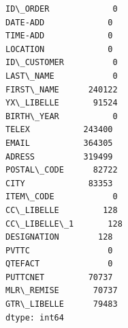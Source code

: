 \documentclass[11pt]{article}
\makeatletter
\newcommand{\boxspacing}{\kern\kvtcb@left@rule\kern\kvtcb@boxsep}
\newcommand{\prompt}[4]{
        \ttfamily\llap{{\color{#2}[#3]:\hspace{3pt}#4}}\vspace{-\baselineskip}
    }
\makeatother
\begin{document}
            \begin{tcolorbox}[breakable, size=fbox, boxrule=.5pt, pad at break*=1mm, opacityfill=0]
\prompt{Out}{outcolor}{15}{\boxspacing}
\begin{Verbatim}[commandchars=\\\{\}]
ID\_ORDER             0
DATE-ADD             0
TIME-ADD             0
LOCATION             0
ID\_CUSTOMER          0
LAST\_NAME            0
FIRST\_NAME      240122
YX\_LIBELLE       91524
BIRTH\_YEAR           0
TELEX           243400
EMAIL           364305
ADRESS          319499
POSTAL\_CODE      82722
CITY             83353
ITEM\_CODE            0
CC\_LIBELLE         128
CC\_LIBELLE\_1       128
DESIGNATION        128
PVTTC                0
QTEFACT              0
PUTTCNET         70737
MLR\_REMISE       70737
GTR\_LIBELLE      79483
dtype: int64
\end{Verbatim}
\end{tcolorbox}
        
\end{document}
